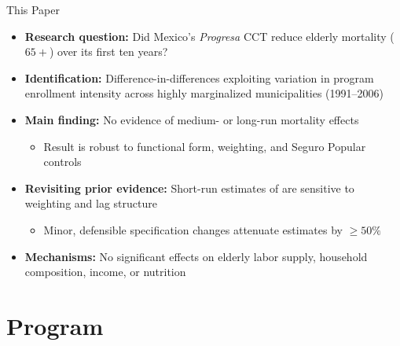 \documentclass[aspectratio=169,usenames,dvipsnames]{beamer}
\newcommand{\smallcite}[1]{{\footnotesize\textcolor{Blue}{\citep{#1}}}}
\begin{document}
\begin{frame}{This Paper}\label{thispaper}
\vspace{4pt}
\small
\begin{itemize}
  \item[$\circ$] \textbf{Research question:} Did Mexico's \textit{Progresa} CCT reduce elderly mortality ($65+$) over its first ten years?
  \vspace{6pt}
  \item[$\circ$] \textbf{Identification:} Difference-in-differences exploiting variation in program enrollment intensity across highly marginalized municipalities (1991--2006)
  \vspace{6pt}
  \item[$\circ$] \textbf{Main finding:} \textcolor{redUT}{No evidence of medium- or long-run mortality effects}
    \begin{itemize}
      \item Result is robust to functional form, weighting, and Seguro Popular controls
    \end{itemize}
  \vspace{6pt}
  \item[$\circ$] \textbf{Revisiting prior evidence:} Short-run estimates of \smallcite{BarhamRowberry2013JDE} are sensitive to weighting and lag structure
    \begin{itemize}
      \item Minor, defensible specification changes attenuate estimates by $\geq 50\%$
    \end{itemize}
  \vspace{6pt}
  \item[$\circ$] \textbf{Mechanisms:} No significant effects on elderly labor supply, household composition, income, or nutrition
\end{itemize}
\end{frame}


\section{Program}
\end{document}
